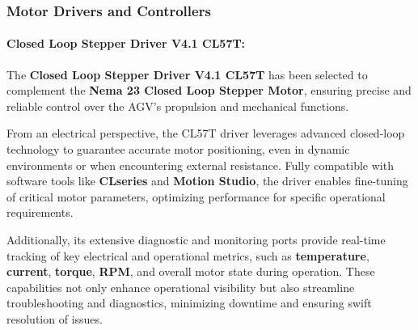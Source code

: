 \documentclass[../../main]{subfiles}
\begin{document}
\subsubsection{Motor Drivers and Controllers}


\paragraph{Closed Loop Stepper Driver V4.1 CL57T:}

The \textbf{Closed Loop Stepper Driver V4.1 CL57T} has been selected 
to complement the \textbf{Nema 23 Closed Loop Stepper Motor}, 
ensuring precise and reliable control over the AGV's propulsion and mechanical functions. 

From an electrical perspective, the CL57T driver leverages 
advanced closed-loop technology to guarantee accurate motor positioning, 
even in dynamic environments or when encountering external resistance. 
Fully compatible with software tools like \textbf{CLseries} and \textbf{Motion Studio}, 
the driver enables fine-tuning of critical motor parameters, optimizing performance 
for specific operational requirements. 

Additionally, its extensive diagnostic and monitoring ports provide 
real-time tracking of key electrical and operational metrics, 
such as \textbf{temperature}, \textbf{current}, \textbf{torque}, \textbf{RPM}, 
and overall motor state during operation. These capabilities not only enhance operational 
visibility but also streamline troubleshooting and diagnostics, minimizing downtime and ensuring swift resolution of issues. 
\end{document}
